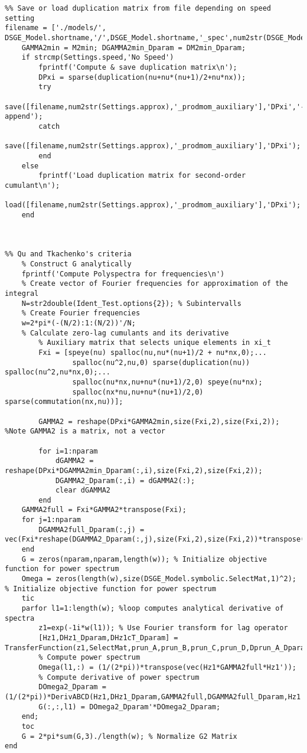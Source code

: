 \documentclass{article}
\begin{document}
\begin{verbatim}
%% Save or load duplication matrix from file depending on speed setting
filename = ['./models/', DSGE_Model.shortname,'/',DSGE_Model.shortname,'_spec',num2str(DSGE_Model.spec),'_approx',];
    GAMMA2min = M2min; DGAMMA2min_Dparam = DM2min_Dparam;
    if strcmp(Settings.speed,'No Speed')
        fprintf('Compute & save duplication matrix\n');
        DPxi = sparse(duplication(nu+nu*(nu+1)/2+nu*nx));
        try
            save([filename,num2str(Settings.approx),'_prodmom_auxiliary'],'DPxi','-append');
        catch
            save([filename,num2str(Settings.approx),'_prodmom_auxiliary'],'DPxi');
        end
    else
        fprintf('Load duplication matrix for second-order cumulant\n');
        load([filename,num2str(Settings.approx),'_prodmom_auxiliary'],'DPxi');
    end



%% Qu and Tkachenko's criteria
    % Construct G analytically
    fprintf('Compute Polyspectra for frequencies\n')
    % Create vector of Fourier frequencies for approximation of the integral
    N=str2double(Ident_Test.options{2}); % Subintervalls
    % Create Fourier frequencies
    w=2*pi*(-(N/2):1:(N/2))'/N;
    % Calculate zero-lag cumulants and its derivative
        % Auxiliary matrix that selects unique elements in xi_t
        Fxi = [speye(nu) spalloc(nu,nu*(nu+1)/2 + nu*nx,0);...
                spalloc(nu^2,nu,0) sparse(duplication(nu)) spalloc(nu^2,nu*nx,0);...
                spalloc(nu*nx,nu+nu*(nu+1)/2,0) speye(nu*nx);
                spalloc(nx*nu,nu+nu*(nu+1)/2,0) sparse(commutation(nx,nu))];

        GAMMA2 = reshape(DPxi*GAMMA2min,size(Fxi,2),size(Fxi,2)); %Note GAMMA2 is a matrix, not a vector

        for i=1:nparam
            dGAMMA2 = reshape(DPxi*DGAMMA2min_Dparam(:,i),size(Fxi,2),size(Fxi,2));
            DGAMMA2_Dparam(:,i) = dGAMMA2(:);
            clear dGAMMA2
        end
    GAMMA2full = Fxi*GAMMA2*transpose(Fxi);
    for j=1:nparam
        DGAMMA2full_Dparam(:,j) = vec(Fxi*reshape(DGAMMA2_Dparam(:,j),size(Fxi,2),size(Fxi,2))*transpose(Fxi));
    end
    G = zeros(nparam,nparam,length(w)); % Initialize objective function for power spectrum
    Omega = zeros(length(w),size(DSGE_Model.symbolic.SelectMat,1)^2); % Initialize objective function for power spectrum
    tic
    parfor l1=1:length(w); %loop computes analytical derivative of spectra
        z1=exp(-1i*w(l1)); % Use Fourier transform for lag operator
        [Hz1,DHz1_Dparam,DHz1cT_Dparam] = TransferFunction(z1,SelectMat,prun_A,prun_B,prun_C,prun_D,Dprun_A_Dparam,Dprun_B_Dparam,Dprun_C_Dparam,Dprun_D_Dparam);
        % Compute power spectrum
        Omega(l1,:) = (1/(2*pi))*transpose(vec(Hz1*GAMMA2full*Hz1'));
        % Compute derivative of power spectrum
        DOmega2_Dparam = (1/(2*pi))*DerivABCD(Hz1,DHz1_Dparam,GAMMA2full,DGAMMA2full_Dparam,Hz1',DHz1cT_Dparam);
        G(:,:,l1) = DOmega2_Dparam'*DOmega2_Dparam;
    end;
    toc
    G = 2*pi*sum(G,3)./length(w); % Normalize G2 Matrix
end


\end{verbatim}
\end{document}
